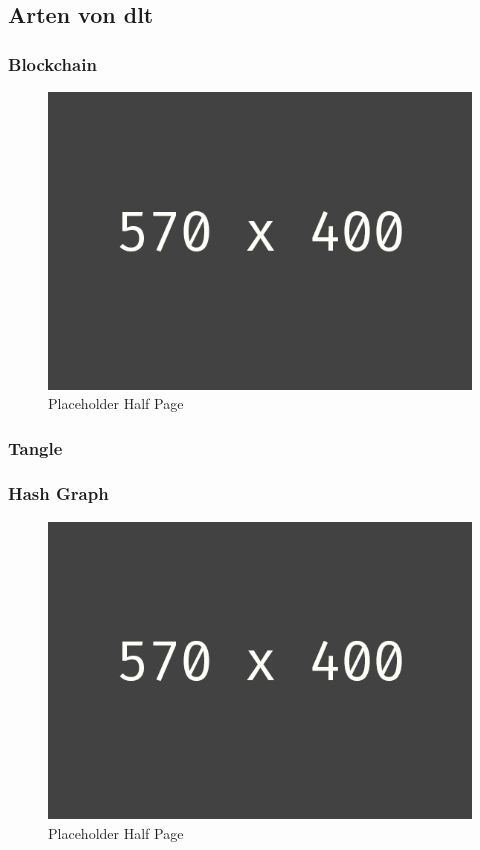 \subsection{Arten von \acl{dlt}}


\subsubsection{Blockchain}
\begin{figure}[h!]
	\centering
	\includegraphics[width=1.0\linewidth]{pictures/placeholder_half_page}
	\caption[Placeholder Half Page]{Placeholder Half Page}
	\label{fig:placeholder_half_page}
\end{figure}


\subsubsection{Tangle}


\subsubsection{Hash Graph}
\begin{figure}[h!]
	\centering
	\includegraphics[width=1.0\linewidth]{pictures/placeholder_half_page}
	\caption[Placeholder Half Page]{Placeholder Half Page}
	\label{fig:placeholder_half_page}
\end{figure}


